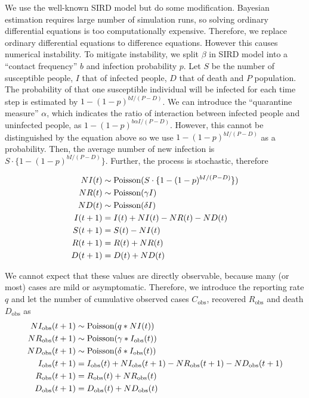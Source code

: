 \documentclass{article}
\begin{document}
We use the well-known SIRD model but do some modification.
Bayesian estimation requires large number of simulation runs, so solving ordinary differential equations is too computationally expensive.
Therefore, we replace ordinary differential equations to difference equations.
However this causes numerical instability.
To mitigate instability, we split $\beta$ in SIRD model into a ``contact frequency'' $b$ and infection probability $p$.
Let $S$ be the number of susceptible people, $I$ that of infected people, $D$ that of death and $P$ population.
The probability of that one susceptible individual will be infected for each time step is estimated by $1 - (1 - p)^{b I / (P - D)}$.
We can introduce the ``quarantine measure'' $\alpha$, which indicates the ratio of interaction between infected people and uninfected people, as $1 - (1 - p)^{b \alpha I / (P - D)}$.
However, this cannot be distinguished by the equation above so we use $1 - (1 - p)^{b I / (P - D)}$ as a probability.
Then, the average number of new infection is $S \cdot \{1 -  (1 - p)^{b I / (P - D)} \}$.
Further, the process is stochastic, therefore 

\begin{align}
    NI(t) &\sim \textup{Poisson}(S \cdot \{1 -  (1 - p)^{b I / (P - D)} \})\\
    NR(t) &\sim \textup{Poisson}(\gamma I)\\
    ND(t) &\sim \textup{Poisson}(\delta I)\\
    I(t+1) &=  I(t) + NI(t) - NR(t) - ND(t)\\
    S(t+1) &= S(t) - NI(t)\\
    R(t+1) &= R(t) + NR(t)\\
    D(t+1) &= D(t) + ND(t)
\end{align}

We cannot expect that these values are directly observable, because many (or most) cases are mild or asymptomatic.
Therefore, we introduce the reporting rate $q$ and let the number of cumulative observed cases $C_{\text{obs}}$, recovered $R_{\text{obs}}$ and death $D_{\text{obs}}$ as
\begin{align}
    NI_{\text{obs}}(t+1) &\sim \textup{Poisson}(q * NI(t))\\
    NR_{\text{obs}}(t+1) &\sim \textup{Poisson}(\gamma * I_{\text{obs}}(t))\\
    ND_{\text{obs}}(t+1) &\sim \textup{Poisson}(\delta * I_{\text{obs}}(t))\\
    I_{\text{obs}}(t+1) &= I_{\text{obs}}(t) + NI_{\text{obs}}(t+1) - NR_{\text{obs}}(t+1) - ND_{\text{obs}}(t+1)\\
    R_{\text{obs}}(t+1) &= R_{\text{obs}}(t) + NR_{\text{obs}}(t)\\
    D_{\text{obs}}(t+1) &= D_{\text{obs}}(t) + ND_{\text{obs}}(t)
\end{align}
\end{document}
